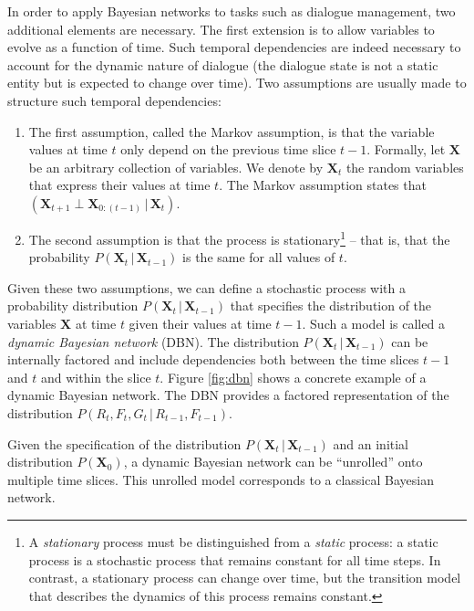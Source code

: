 In order to apply Bayesian networks to tasks such as dialogue management, two additional elements are necessary. The first extension is to allow variables to evolve as a function of time.  Such temporal dependencies are indeed necessary to account for the dynamic nature of dialogue (the dialogue state is not a static entity but is expected to change over time). Two assumptions are usually made to structure such temporal dependencies: \begin{enumerate}
\item The first assumption, called the Markov assumption, is that the variable values at time $t$ only depend on the previous time slice $t\!-\!1$.  Formally, let $\mathbf{X}$ be an arbitrary collection of variables. We denote by $\mathbf{X}_t$ the random variables that express their values at time $t$.  The Markov assumption states that $(\mathbf{X}_{t+1} \; \bot \; \mathbf{X}_{0:(t-1)}  \, | \,  \mathbf{X}_{t})$.  

\item The second assumption is that the process is stationary\footnote{A \textit{stationary} process must be distinguished from a \textit{static} process: a static process is a stochastic process that remains constant for all time steps. In contrast, a stationary process can change over time, but the transition model that describes the dynamics of this process remains constant.} -- that is, that the probability $P(\mathbf{X}_t  \, | \,  \mathbf{X}_{t\!-\!1})$ is the same for all values of $t$.
\end{enumerate}

Given these two assumptions, we can define a stochastic process with a probability distribution $P(\mathbf{X}_t  \, | \,  \mathbf{X}_{t\!-\!1})$ that specifies the distribution of the variables $\mathbf{X}$ at time $t$ given their values at time $t\!-\!1$. Such a model is called a \textit{dynamic Bayesian network} (DBN). The distribution $P(\mathbf{X}_t  \, | \,  \mathbf{X}_{t\!-\!1})$ can be internally factored and include dependencies both between the time slices $t\!-\!1$ and $t$ and within the slice $t$.  Figure \ref{fig:dbn} shows a concrete example of a dynamic Bayesian network. The DBN provides a factored representation of the distribution  $P(R_t, F_t, G_t \, | \, R_{t\!-\!1}, F_{t\!-\!1})$.  

Given the specification of the distribution $P(\mathbf{X}_t  \, | \,  \mathbf{X}_{t\!-\!1})$ and an initial distribution $P(\mathbf{X}_0)$, a dynamic Bayesian network can be ``unrolled'' onto multiple time slices.  This unrolled model corresponds to a classical Bayesian network.  

